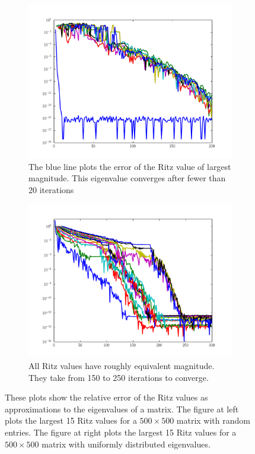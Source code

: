 \begin{figure}
\centering
\begin{subfigure}[b]{.49\textwidth}
    \centering
    \includegraphics[width=\textwidth]{figures/rand_vals_conv.pdf}
    \caption{The blue line plots the error of the Ritz value of largest magnitude.
    This eigenvalue converges after fewer than 20 iterations}
    \label{fig:arnoldi_random_val_conv}
\end{subfigure}
\begin{subfigure}[b]{.49\textwidth}
    \centering
    \includegraphics[width=\textwidth]{figures/rand_eigs_conv.pdf}
    \caption{All Ritz values have roughly equivalent magnitude.
    They take from 150 to 250 iterations to converge. }
    \label{fig:arnoldi_random_eig_conv}
\end{subfigure}
\caption{These plots show the relative error of the Ritz values as approximations to the eigenvalues of a matrix.
The figure at left plots the largest 15 Ritz values for a $500\times 500$ matrix with random entries.
The figure at right plots the largest 15 Ritz values for a $500\times 500$ matrix with uniformly distributed eigenvalues.}
\end{figure}

